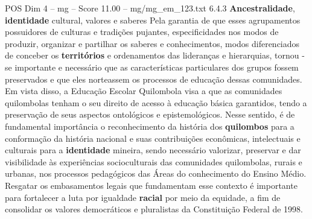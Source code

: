 \begin{textsample}{POS Dim 4 – mg – Score 11.00 – mg/mg\_em\_123.txt}  \label{ex:f4_pos_196}
6.4.3 \textbf{Ancestralidade}, \textbf{identidade} cultural, valores e saberes Pela garantia de que esses agrupamentos possuidores de culturas e tradições pujantes, especificidades nos modos de produzir, organizar e partilhar os saberes e conhecimentos, modos diferenciados de conceber os \textbf{territórios} e ordenamentos das lideranças e hierarquias, tornou -se importante e necessário que as características particulares dos grupos fossem preservados e que eles norteassem os processos de educação dessas comunidades.
Em vista disso, a Educação Escolar Quilombola visa a que as comunidades quilombolas tenham o seu direito de acesso à educação básica garantidos, tendo a preservação de seus aspectos ontológicos e epistemológicos.
Nesse sentido, é de fundamental importância o reconhecimento da história dos \textbf{quilombos} para a conformação da história nacional e suas contribuições econômicas, intelectuais e culturais para a \textbf{identidade} mineira, sendo necessário valorizar, preservar e dar visibilidade às experiências socioculturais das comunidades quilombolas, rurais e urbanas, nos processos pedagógicos das Áreas do conhecimento do Ensino Médio.
Resgatar os embasamentos legais que fundamentam esse contexto é importante para fortalecer a luta por igualdade \textbf{racial} por meio da equidade, a fim de consolidar os valores democráticos e pluralistas da Constituição Federal de 1998.

\end{textsample}

